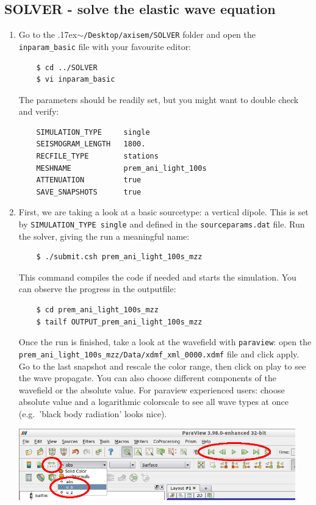 \documentclass{article}
\newcommand{\ttilde}[0]{\raise.17ex\hbox{$\scriptstyle\sim$}}
\begin{document}
\subsection{SOLVER - solve the elastic wave equation}
    
\begin{enumerate}
    \item Go to the \ttilde\verb|/Desktop/axisem/SOLVER| folder and open the
    \verb|inparam_basic| file with your favourite editor:
    \begin{verbatim}
    $ cd ../SOLVER
    $ vi inparam_basic
    \end{verbatim}
    The parameters should be readily set, but you might want to double check and verify:
    \begin{verbatim}
    SIMULATION_TYPE     single
    SEISMOGRAM_LENGTH   1800.
    RECFILE_TYPE        stations 
    MESHNAME            prem_ani_light_100s
    ATTENUATION         true 
    SAVE_SNAPSHOTS      true  
    \end{verbatim}
    \item First, we are taking a look at a basic sourcetype: a vertical dipole. This is
    set by \verb|SIMULATION_TYPE single| and defined in the \verb|sourceparams.dat| file.
    Run the solver, giving the run a meaningful name:
    \begin{verbatim}
    $ ./submit.csh prem_ani_light_100s_mzz
    \end{verbatim}
    This command compiles the code if needed and starts the simulation. You can observe
    the progress in the outputfile:
    \begin{verbatim}
    $ cd prem_ani_light_100s_mzz
    $ tailf OUTPUT_prem_ani_light_100s_mzz
    \end{verbatim}
    Once the run is finished, take a look at the wavefield with \verb|paraview|: open
    the \verb|prem_ani_light_100s_mzz/Data/xdmf_xml_0000.xdmf| file and click apply. Go to
    the last snapshot and rescale the color range, then click on play to see the wave
    propagate.  You can also choose different components of the wavefield or the absolute
    value.  For paraview experienced users: choose absolute value and a logarithmic
    colorscale to see all wave types at once (e.g.\ 'black body radiation' looks nice).
   
    \begin{center}
    \includegraphics[width=120mm]{paraview2.png}
    \end{center}


\end{enumerate}
\end{document}

